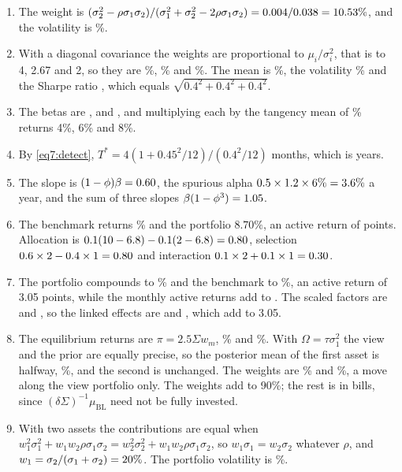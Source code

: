 \begin{chapterrefs}
\begin{enumerate}[label=\textbf{7.\arabic*}, leftmargin=*]
  \item The weight is $(\sigma_2^2-\rho\sigma_1\sigma_2)/(\sigma_1^2+\sigma_2^2-2\rho\sigma_1\sigma_2)
  =0.004/0.038=10.53\%$, and the volatility is \xrOneVol\%.
  \item With a diagonal covariance the weights are proportional to $\mu_i/\sigma_i^2$, that is to 4,
  2.67 and 2, so they are \xrTwoA\%, \xrTwoB\% and \xrTwoC\%. The mean is \xrTwoMu\%, the volatility
  \xrTwoVol\% and the Sharpe ratio \xrTwoSR, which equals $\sqrt{0.4^2+0.4^2+0.4^2}$.
  \item The betas are \xrThreeA, \xrThreeB{} and \xrThreeC, and multiplying each by the tangency mean of
  \xrTwoMu\% returns 4\%, 6\% and 8\%.
  \item By \cref{eq7:detect}, $T^*=4(1+0.45^2/12)/(0.4^2/12)$ months, which is \xrFour{} years.
  \item The slope is $(1-\phi)\beta=0.60$, the spurious alpha $0.5\times1.2\times6\%=3.6\%$ a
  year, and the sum of three slopes $\beta(1-\phi^3)=1.05$.
  \item The benchmark returns \xrSixRb\% and the portfolio $8.70\%$, an active return of \xrSixActive{}
  points. Allocation is $0.1(10-6.8)-0.1(2-6.8)=0.80$, selection $0.6\times2-0.4\times1=0.80$
  and interaction $0.1\times2+0.1\times1=0.30$.
  \item The portfolio compounds to \xrSevenP\% and the benchmark to \xrSevenB\%, an active return of
  3.05 points, while the monthly active returns add to \xrSevenSum. The scaled factors are
  \xrSevenKone{} and \xrSevenKtwo, so the linked effects are \xrSevenOne{} and \xrSevenTwo, which add
  to 3.05.
  \item The equilibrium returns are $\pi=2.5\Sigma w_m$, \xrEightPiA\% and \xrEightPiB\%. With
  $\Omega=\tau\sigma_1^2$ the view and the prior are equally precise, so the posterior mean of the first
  asset is halfway, \xrEightMuA\%, and the second is unchanged. The weights are \xrEightWA\% and
  \xrEightWB\%, a move along the view portfolio only. The weights add to 90\%; the rest is in bills, since
$(\delta\Sigma)^{-1}\mu_{\mathrm{BL}}$ need not be fully invested.
  \item With two assets the contributions are equal when $w_1^2\sigma_1^2+w_1w_2\rho\sigma_1\sigma_2=w_2^2\sigma_2^2+w_1w_2\rho\sigma_1\sigma_2$,
  so $w_1\sigma_1=w_2\sigma_2$ whatever $\rho$, and $w_1=\sigma_2/(\sigma_1+\sigma_2)=20\%$. The
  portfolio volatility is \xrNineVol\%.
\end{enumerate}


\end{chapterrefs}
